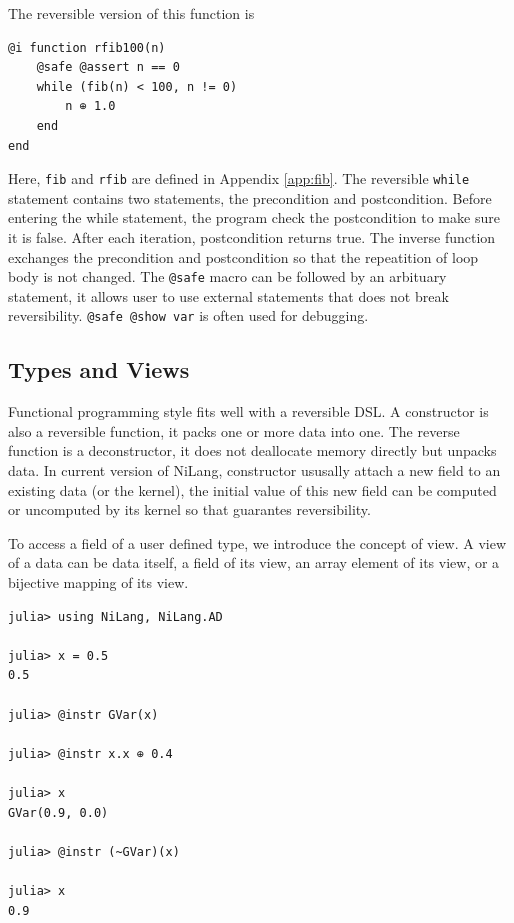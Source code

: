 \documentclass[aps,twocolumn,longbibliography,english,superscriptaddress,prr]{revtex4-1}
\newcommand{\<}{\langle}
\renewcommand{\>}{\rangle}
\newcommand{\App}[1]{Appendix \ref{#1}}
\begin{document}
The reversible version of this function is
\begin{minipage}{.44\textwidth}
\begin{lstlisting}
@i function rfib100(n)
    @safe @assert n == 0
    while (fib(n) < 100, n != 0)
        n ⊕ 1.0
    end
end
\end{lstlisting}
\end{minipage}

Here, \texttt{fib} and \texttt{rfib} are defined in \App{app:fib}.
The reversible \texttt{while} statement contains two statements, the precondition and postcondition.
Before entering the while statement, the program check the postcondition to make sure it is false.
After each iteration, postcondition returns true. The inverse function exchanges the precondition and postcondition so that the repeatition of loop body is not changed.
The \texttt{@safe} macro can be followed by an arbituary statement, it allows user to use external statements that does not break reversibility.
\texttt{@safe @show var} is often used for debugging.

\subsection{Types and Views}
Functional programming style fits well with a reversible DSL.
A constructor is also a reversible function, it packs one or more data into one.
The reverse function is a deconstructor, it does not deallocate memory directly but unpacks data.
In current version of NiLang, constructor ususally attach a new field to an existing data (or the kernel), the initial value of this new field can be computed or uncomputed by its kernel so that guarantes reversibility.

To access a field of a user defined type, we introduce the concept of view.
A view of a data can be data itself, a field of its view, an array element of its view, or a bijective mapping of its view.

\begin{minipage}{.44\textwidth}
\begin{lstlisting}
julia> using NiLang, NiLang.AD

julia> x = 0.5
0.5

julia> @instr GVar(x)

julia> @instr x.x ⊕ 0.4

julia> x
GVar(0.9, 0.0)

julia> @instr (~GVar)(x)

julia> x
0.9
\end{lstlisting}
\end{minipage}
\end{document}
